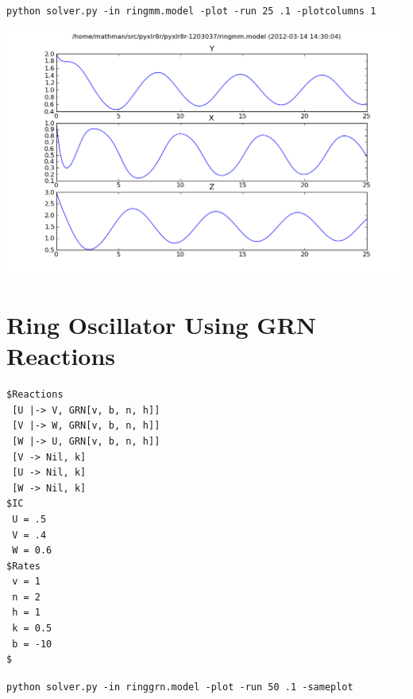 \begin{center}
{\tt  python solver.py -in ringmm.model -plot -run 25 .1 -plotcolumns 1}
\end{center}

\begin{center}
\includegraphics[width=\textwidth]{ringmm.png}
\end{center}

\pagebreak


\section{Ring Oscillator Using GRN Reactions}

\begin{changemargin}{1.5in}{1in}
\begin{scriptsize}
\begin{Verbatim}[frame=single,xrightmargin=\leftmargin]
$Reactions
 [U |-> V, GRN[v, b, n, h]]
 [V |-> W, GRN[v, b, n, h]]
 [W |-> U, GRN[v, b, n, h]]
 [V -> Nil, k]
 [U -> Nil, k]
 [W -> Nil, k]
$IC
 U = .5
 V = .4
 W = 0.6
$Rates
 v = 1
 n = 2
 h = 1
 k = 0.5
 b = -10
$
\end{Verbatim}
\end{scriptsize}
\end{changemargin}

\begin{center}
{\tt  python solver.py -in ringgrn.model -plot -run 50 .1 -sameplot}
\end{center}

